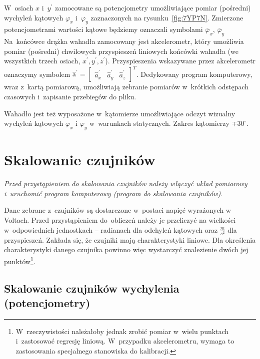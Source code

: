 \documentclass[paper=a4,DIV=12]{tmmlab}
\newcommand{\brm}[1]{\bm{\mathrm{#1}}}
\begin{document}
W~osiach $x$ i~$y^{\prime}$ zamocowane są potencjometry umożliwiające pomiar
(pośredni) wychyleń kątowych $\varphi_x$ i~$\varphi_y$ zaznaczonych na
rysunku~\ref{fig:7YP7N}. Zmierzone potencjometrami wartości kątowe będziemy
oznaczali symbolami $\bar{\varphi}_x$, $\bar{\varphi}_y$ Na~końcówce drążka
wahadła zamocowany jest akcelerometr, który umożliwia pomiar (pośredni)
chwilowych przyspieszeń liniowych końcówki wahadła (we wszystkich trzech
osiach, $x^{\prime},y^{\prime},z^{\prime}$). Przyspieszenia wskazywane przez
akcelerometr oznaczymy symbolem $\hat{\brm{a}}^{\prime} = \begin{bmatrix}
\hat{a}_x^{\prime} & \hat{a}_y^{\prime} & \hat{a}_z^{\prime} \end{bmatrix}^T$.
Dedykowany program komputerowy, wraz z~kartą pomiarową, umożliwiają zebranie
pomiarów w~krótkich odstępach czasowych i~zapisanie przebiegów do pliku.

Wahadło jest też wyposażone w~kątomierze umożliwiające odczyt wizualny wychyleń
kątowych $\varphi_x$ i $\varphi_y$ w~warunkach statycznych. Zakres kątomierzy
$\mp 30^{\circ}$.

\section{Skalowanie czujników}
\label{eq:NC01F}

{\em Przed przystąpieniem do skalowania czujników należy włączyć układ
pomiarowy i~uruchomić program komputerowy (program do skalowania czujników)}.

Dane zebrane z~czujników są dostarczone w~postaci napięć wyrażonych w Voltach.
Przed przy\-stą\-pie\-niem do~obliczeń należy je przeliczyć na wielkości
w~odpowiednich jednostkach -- radianach dla odchyleń kątowych oraz
$\tfrac{m}{s^2}$ dla przyspieszeń. Zakłada się, że czujniki mają
charakterystyki liniowe. Dla określenia charakterystyki danego czujnika
powinno więc wystarczyć znalezienie dwóch jej punktów\footnote{W~rzeczywistości
należałoby jednak zrobić pomiar w~wielu punktach i~zastosować regresję
liniową. W~przypadku akcelerometru, wymaga to zastosowania specjalnego
stanowiska do kalibracji.}.

\subsection{Skalowanie czujników wychylenia (potencjometry)}
\label{eq:460IS}
\end{document}
